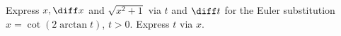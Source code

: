 Express $x, \diff x $ and $\sqrt{x^2+1}$ via $t$ and $\diff t$ for the Euler substitution $x=\cot(2\arctan t)$, $t>0$. Express $t$ via $x$.
